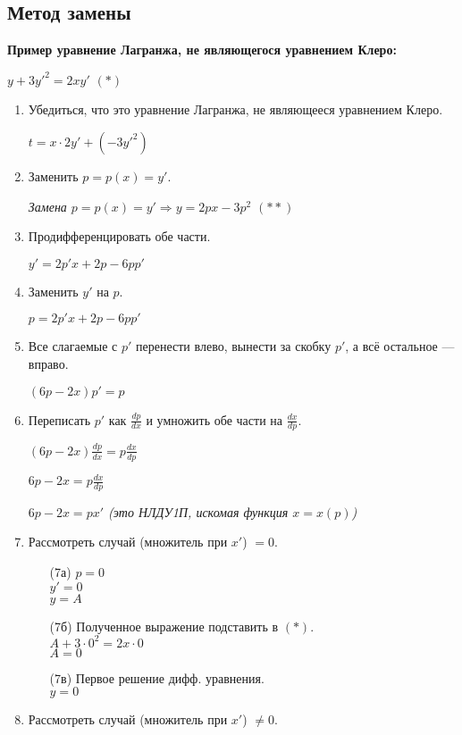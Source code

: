 \documentclass[10pt, a4paper]{article}
\begin{document}
\subsection{Метод замены}
\textbf{Пример уравнение Лагранжа, не являющегося уравнением Клеро:}
\par $y + 3y'^2 = 2xy'$ $(*)$
\begin{enumerate}
    \item Убедиться, что это уравнение Лагранжа, не являющееся уравнением Клеро.
        \par $t = x \cdot 2y' + (-3y'^2)$
    \item Заменить $p = p(x) = y'$.
        \par\textit{Замена $p = p(x) = y' \Rightarrow y = 2px - 3p^2$ $(**)$}
    \item Продифференцировать обе части.
        \par $y' = 2p'x + 2p - 6pp'$
    \item Заменить $y'$ на $p$.
        \par $p = 2p'x + 2p - 6pp'$
    \item Все слагаемые с $p'$ перенести влево, вынести за скобку $p'$, а всё остальное — вправо.
        \par $(6p - 2x)p' = p$
    \item Переписать $p'$ как $\frac{dp}{dx}$ и умножить обе части на $\frac{dx}{dp}$.
        \par $(6p - 2x)\frac{dp}{dx} = p\frac{dx}{dp}$
        \par $6p - 2x = p\frac{dx}{dp}$
        \par\textit{$6p - 2x = px'$ (это НЛДУ1П, искомая функция $x = x(p)$)}
    \item Рассмотреть случай (множитель при $x'$) $= 0$.
        \begin{enumerate}
            \item[(7а)] $p = 0$ \\
                  $y' = 0$ \\
                  $y = A$
            \item[(7б)] Полученное выражение подставить в $(*)$. \\
                  $A + 3 \cdot 0^2 = 2x \cdot 0$ \\
                  $A = 0$
            \item[(7в)] Первое решение дифф. уравнения. \\
                  $y = 0$
        \end{enumerate}
    \item Рассмотреть случай (множитель при $x'$) $\neq 0$.

\end{enumerate}
\end{document}

